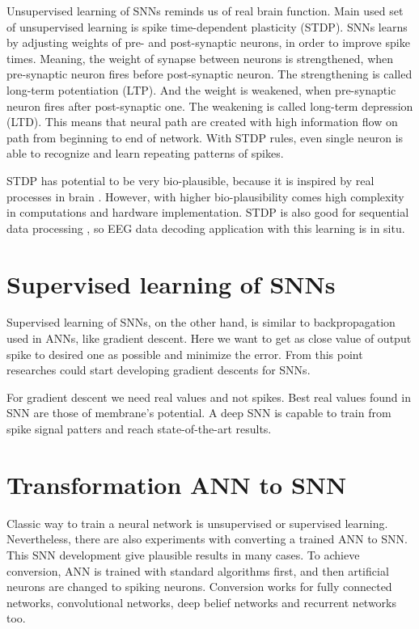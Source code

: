 Unsupervised learning of SNNs reminds us of real brain function. Main used set of unsupervised learning is spike time-dependent plasticity (STDP). SNNs learns by adjusting weights of pre- and post-synaptic neurons, in order to improve spike times. Meaning, the weight of synapse between neurons is strengthened, when pre-synaptic neuron fires before post-synaptic neuron. The strengthening is called long-term potentiation (LTP). And the weight is weakened, when pre-synaptic neuron fires after post-synaptic one. The weakening is called long-term depression (LTD). This means that neural path are created with high information flow on path from beginning to end of network. With STDP rules, even single neuron is able to recognize and learn repeating patterns of spikes. \cite{dl-with-sneurons}

STDP has potential to be very bio-plausible, because it is inspired by real processes in brain \cite{stdp-biological}. However, with higher bio-plausibility comes high complexity in computations and hardware implementation. STDP is also good for sequential data processing \cite{survey-stdp}, so EEG data decoding application with this learning is in situ.


\section{Supervised learning of SNNs}%
\label{sec:supervised_snn}

Supervised learning of SNNs, on the other hand, is similar to backpropagation used in ANNs, like gradient descent. Here we want to get as close value of output spike to desired one as possible and minimize the error. From this point researches could start developing gradient descents for SNNs. \cite{backprop-snns}

For gradient descent we need real values and not spikes. Best real values found in SNN are those of membrane's potential. A deep SNN is capable to train from spike signal patters and reach state-of-the-art results. \cite{dl-with-sneurons}


\section{Transformation ANN to SNN}%
\label{sec:trans_ann2snn}

Classic way to train a neural network is unsupervised or supervised learning. Nevertheless, there are also experiments with converting a trained ANN to SNN. This SNN development give plausible results in many cases. \cite{dl-in-snns}
To achieve conversion, ANN is trained with standard algorithms first, and then artificial neurons are changed to spiking neurons. Conversion works for fully connected networks, convolutional networks, deep belief networks and recurrent networks too.

